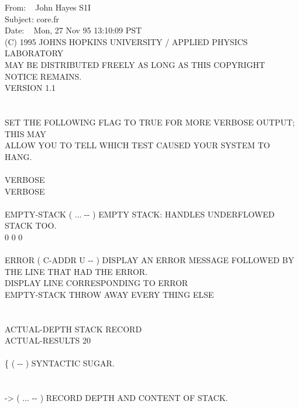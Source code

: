 \begin{tt}
 From: ~ John Hayes S1I \\
 Subject: core.fr \\
 Date: ~ Mon, 27 Nov 95 13:10:09 PST \\
 (C) 1995 JOHNS HOPKINS UNIVERSITY / APPLIED PHYSICS LABORATORY\\
 MAY BE DISTRIBUTED FREELY AS LONG AS THIS COPYRIGHT NOTICE REMAINS.\\
 VERSION 1.1\\
 \\
\\
 SET THE FOLLOWING FLAG TO TRUE FOR MORE VERBOSE OUTPUT; THIS MAY \\
 ALLOW YOU TO TELL WHICH TEST CAUSED YOUR SYSTEM TO HANG. \\
\\
 VERBOSE \\
\tab[1.2]  VERBOSE \word{!} \\
\\
\word{:} EMPTY-STACK \tab {} ( ... -{}- ) EMPTY STACK: HANDLES UNDERFLOWED STACK TOO. \\
\tab {}       0  0   0      \word{;} \\
\\
\word{:} ERROR \tab {} ( C-ADDR U -{}- ) DISPLAY AN ERROR MESSAGE FOLLOWED BY\\
\tab[5.2]  THE LINE THAT HAD THE ERROR.\\
\tab {}   		\tab[3]  DISPLAY LINE CORRESPONDING TO ERROR\\
\tab EMPTY-STACK											\tab[7.8]  THROW AWAY EVERY THING ELSE\\
\word{;} \\
\\
 ACTUAL-DEPTH \tab[3]  STACK RECORD\\
\tab[.7]  ACTUAL-RESULTS 20   \\
\\
\word{:} \{ \tab[2.8]  ( -{}- ) SYNTACTIC SUGAR.\\
\tab \word{;} \\
\\
\word{:} -> \tab[2.2]  ( ... -{}- ) RECORD DEPTH AND CONTENT OF STACK.\\

\end{tt}
